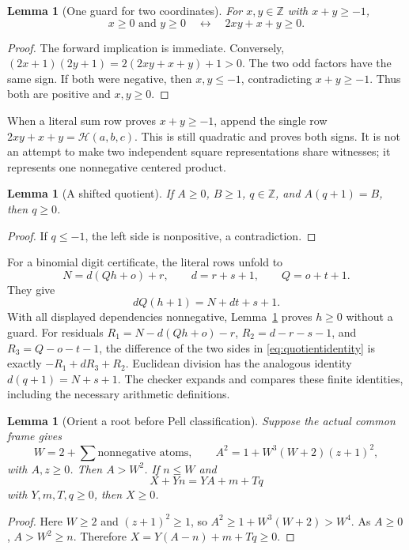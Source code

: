 \documentclass[11pt,letterpaper]{article}
\newtheorem{lemma}[theorem]{Lemma}
\theoremstyle{definition}
\theoremstyle{remark}
\newcommand{\Z}{\mathbb Z}
\begin{document}
\begin{lemma}[One guard for two coordinates]\label{lem:pair}
For $x,y\in\Z$ with $x+y\ge-1$,
\[
 x\ge0\text{ and }y\ge0
       \quad\longleftrightarrow\quad 2xy+x+y\ge0.
\]
\end{lemma}
\begin{proof}
The forward implication is immediate. Conversely,
$(2x+1)(2y+1)=2(2xy+x+y)+1>0$. The two odd factors have the same
sign. If both were negative, then $x,y\le-1$, contradicting
$x+y\ge-1$. Thus both are positive and $x,y\ge0$.
\end{proof}

When a literal sum row proves $x+y\ge-1$, append the single row
$2xy+x+y=\mathcal H(a,b,c)$. This is still quadratic and proves both
signs. It is not an attempt to make two independent square
representations share witnesses; it represents one nonnegative
centered product.

\begin{lemma}[A shifted quotient]\label{lem:quotient}
If $A\ge0$, $B\ge1$, $q\in\Z$, and $A(q+1)=B$, then $q\ge0$.
\end{lemma}
\begin{proof}
If $q\le-1$, the left side is nonpositive, a contradiction.
\end{proof}

For a binomial digit certificate, the literal rows unfold to
\[
 N=d(Qh+o)+r,\qquad d=r+s+1,\qquad Q=o+t+1.
\]
They give
\begin{equation}\label{eq:quotientidentity}
                     dQ(h+1)=N+dt+s+1.
\end{equation}
With all displayed dependencies nonnegative, Lemma~\ref{lem:quotient}
proves $h\ge0$ without a guard. For residuals
$R_1=N-d(Qh+o)-r$, $R_2=d-r-s-1$, and $R_3=Q-o-t-1$, the
difference of the two sides in \eqref{eq:quotientidentity} is exactly
$-R_1+dR_3+R_2$. Euclidean division has the analogous identity
$d(q+1)=N+s+1$. The checker expands and compares these finite
identities, including the necessary arithmetic definitions.

\begin{lemma}[Orient a root before Pell classification]\label{lem:frame}
Suppose the actual common frame gives
\[
 W=2+\sum\text{nonnegative atoms},\qquad
 A^2=1+W^3(W+2)(z+1)^2,
\]
with $A,z\ge0$. Then $A>W^2$. If $n\le W$ and
\[
                       X+Yn=YA+m+Tq
\]
with $Y,m,T,q\ge0$, then $X\ge0$.
\end{lemma}
\begin{proof}
Here $W\ge2$ and $(z+1)^2\ge1$, so
$A^2\ge1+W^3(W+2)>W^4$. As $A\ge0$, $A>W^2\ge n$.
Therefore $X=Y(A-n)+m+Tq\ge0$.
\end{proof}
\end{document}
